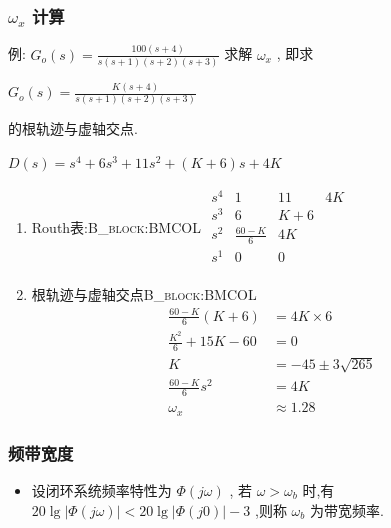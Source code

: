 \documentclass[table]{beamer}
\begin{document}
\subsubsection{\(\omega_x\) 计算}
\label{sec:org0691b81}
例: \(G_o(s)=\frac{100(s+4)}{s(s+1)(s+2)(s+3)}\) 求解 \(\omega_x\) , 即求 

\(G_o(s)=\frac{K(s+4)}{s(s+1)(s+2)(s+3)}\) 

的根轨迹与虚轴交点.

\(D(s)=s^4+6s^3+11s^2+(K+6)s+4K\)

\begin{enumerate}
\item Routh表:\hfill{}\textsc{B\_block:BMCOL}
\label{sec:orgbf11488}
\begin{math}
\begin{matrix}
s^4 & 1  & 11     & 4K \\
s^3 & 6  & K+6  \\
s^2 & \frac{60-K}{6} & 4K \\
s^1 & 0 & 0 \\
\end{matrix}
\end{math}

\item 根轨迹与虚轴交点\hfill{}\textsc{B\_block:BMCOL}
\label{sec:org3d5d606}
\begin{align*}
\frac{60-K}{6}(K+6) &=4K\times 6 \\
\frac{K^2}{6}+15K-60 &=0\\
K&=-45\pm 3\sqrt{265}\\
\frac{60-K}{6}s^2 &= 4K\\
\omega_x &\approx 1.28
\end{align*}
\end{enumerate}
\subsubsection{频带宽度}
\label{sec:org5f85683}
\begin{itemize}
\item 设闭环系统频率特性为 \(\Phi(j\omega)\) , 若 \(\omega>\omega_b\) 时,有 \(20\lg|\Phi(j\omega)| <20\lg|\Phi(j0)|-3\) ,则称 \(\omega_b\) 为带宽频率.

\end{itemize}
\end{document}
